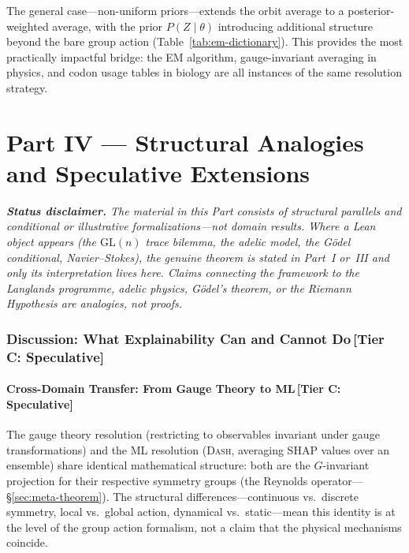 \documentclass[11pt,a4paper]{article}
\newcommand{\DASH}{\textsc{Dash}}
\begin{document}
The general case---non-uniform priors---extends the orbit average to a
posterior-weighted average, with the prior $P(Z \mid \theta)$ introducing
additional structure beyond the bare group action
(Table~\ref{tab:em-dictionary}).  This provides the most practically impactful
bridge: the EM algorithm, gauge-invariant averaging in physics, and codon
usage tables in biology are all instances of the same resolution strategy.


\clearpage
\part{Part IV \textnormal{\large --- Structural Analogies and Speculative Extensions}}
\noindent\emph{\textbf{Status disclaimer.} The material in this Part consists of structural parallels and conditional or illustrative formalizations---\emph{not} domain results. Where a Lean object appears (the $\mathrm{GL}(n)$ trace bilemma, the adelic model, the G\"odel conditional, Navier--Stokes), the genuine theorem is stated in Part~I or~III and only its \emph{interpretation} lives here. Claims connecting the framework to the Langlands programme, adelic physics, G\"odel's theorem, or the Riemann Hypothesis are analogies, not proofs.}\par\medskip

\section{Discussion: What Explainability Can and Cannot Do\,\textnormal{\normalsize[Tier C: Speculative]}}
\label{sec:discussion}

\subsection{Cross-Domain Transfer: From Gauge Theory to ML\,\textnormal{\normalsize[Tier C: Speculative]}}
\label{sec:transfer}

The gauge theory resolution (restricting to observables invariant under gauge transformations) and the ML resolution (\DASH{}, averaging SHAP values over an ensemble) share identical mathematical structure: both are the $G$-invariant projection for their respective symmetry groups (the Reynolds operator---\S\ref{sec:meta-theorem}). The structural differences---continuous vs.\ discrete symmetry, local vs.\ global action, dynamical vs.\ static---mean this identity is at the level of the group action formalism, not a claim that the physical mechanisms coincide.
\end{document}

